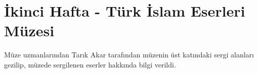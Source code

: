 \section{İkinci Hafta - Türk İslam Eserleri Müzesi}
\indent\indent Müze uzmanlarından Tarık Akar tarafından müzenin üst katındaki sergi alanları gezilip, müzede sergilenen eserler hakkında bilgi verildi.\newpage

